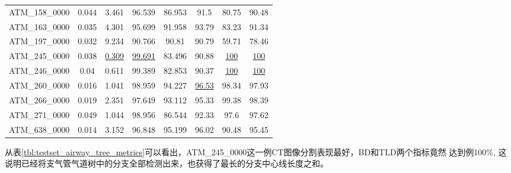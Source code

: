 \begin{table}[ht]
\begin{tabular}{cccccccc}
        ATM\_158\_0000 & 0.044         & 3.461          & 96.539          & 86.953         & 91.5          & 80.75         & 90.48         \\
        ATM\_163\_0000 & 0.035         & 4.301          & 95.699          & 91.958         & 93.79         & 83.23         & 91.34         \\
        ATM\_197\_0000 & 0.032         & 9.234          & 90.766          & 90.81          & 90.79         & 59.71         & 78.46         \\
        ATM\_245\_0000 & 0.038         & \uline{0.309}  & \uline{99.691}  & 83.496         & 90.88         & \uline{100}   & \uline{100}   \\
        ATM\_246\_0000 & 0.04          & 0.611          & 99.389          & 82.853         & 90.37         & \uline{100}   & \uline{100}   \\
        ATM\_260\_0000 & 0.016         & 1.041          & 98.959          & 94.227         & \uline{96.53} & 98.34         & 97.93         \\
        ATM\_266\_0000 & 0.019         & 2.351          & 97.649          & 93.112         & 95.33         & 99.38         & 98.39         \\
        ATM\_271\_0000 & 0.049         & 1.044          & 98.956          & 86.544         & 92.33         & 97.6          & 97.62         \\
        ATM\_638\_0000 & 0.014         & 3.152          & 96.848          & 95.199         & 96.02         & 90.48         & 95.45         \\
        \bottomrule
    \end{tabular}
\end{table}
从表\ref{tbl:testset_airway_tree_metrics}可以看出，ATM\_245\_0000这一例CT图像分割表现最好，BD和TLD两个指标竟然
达到例100\%, 这说明已经将支气管气道树中的分支全部检测出来，也获得了最长的分支中心线长度之和。

